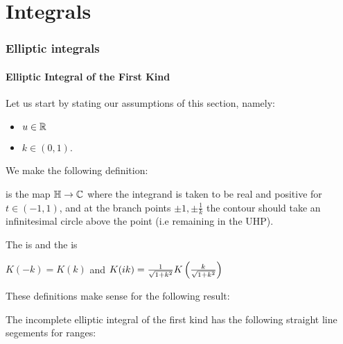 \documentclass{article}
\begin{document}
\part{Integrals}

\section{Elliptic integrals}


\subsection{Elliptic Integral of the First Kind}
Let us start by stating our assumptions of this section, namely:
\begin{itemize}
	\item $u \in \mathbb{R}$
	\item $k \in (0,1)$.
\end{itemize}

We make the following definition:

\begin{definition}
	 is the map $\mathbb{H}\to \mathbb{C}$
where the integrand is taken to be real and positive for $t \in (-1,1)$, and at the branch points $\pm 1, \pm \frac{1}{k}$ the contour should take an infinitesimal circle above the point (i.e remaining in the UHP). 
\end{definition}



\begin{definition}
	The  is 
and the  is 
\end{definition}

\begin{prop}
	$K(-k) = K(k)$ and $K(ik) = \frac{1}{\sqrt{1+k^2}}K\left( \frac{k}{\sqrt{1+k^2}} \right)$
\end{prop}

These definitions make sense for the following result:

\begin{prop}
	The incomplete elliptic integral of the first kind has the following straight line segements for ranges:
\end{prop}
\end{document}
